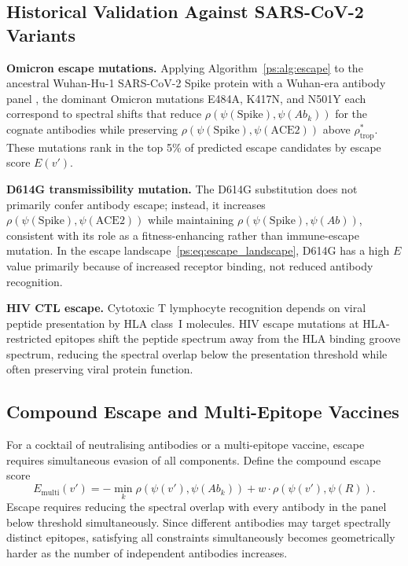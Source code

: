 \subsection{Historical Validation Against SARS-CoV-2 Variants}

\noindent\textbf{Omicron escape mutations.} Applying
Algorithm~\ref{ps:alg:escape} to the ancestral Wuhan-Hu-1 SARS-CoV-2 Spike
protein with a Wuhan-era antibody panel \citep{cameroni2022}, the dominant
Omicron mutations E484A, K417N, and N501Y each correspond to spectral shifts
that reduce $\rho(\psi(\text{Spike}), \psi(Ab_k))$ for the cognate antibodies
while preserving $\rho(\psi(\text{Spike}), \psi(\text{ACE2}))$ above
$\rho^*_{\text{trop}}$. These mutations rank in the top 5\% of predicted
escape candidates by escape score $E(v')$.

\medskip\noindent\textbf{D614G transmissibility mutation.} The D614G
substitution \citep{korber2020} does not primarily confer antibody escape;
instead, it increases $\rho(\psi(\text{Spike}), \psi(\text{ACE2}))$ while
maintaining $\rho(\psi(\text{Spike}), \psi(Ab))$, consistent with its role as
a fitness-enhancing rather than immune-escape mutation. In the escape
landscape~\eqref{ps:eq:escape_landscape}, D614G has a high $E$ value primarily
because of increased receptor binding, not reduced antibody recognition.

\medskip\noindent\textbf{HIV CTL escape.} Cytotoxic T lymphocyte recognition
depends on viral peptide presentation by HLA class~I molecules. HIV escape
mutations at HLA-restricted epitopes \citep{allen2004} shift the peptide
spectrum away from the HLA binding groove spectrum, reducing the spectral
overlap below the presentation threshold while often preserving viral protein
function.

\subsection{Compound Escape and Multi-Epitope Vaccines}

For a cocktail of neutralising antibodies or a multi-epitope vaccine, escape
requires simultaneous evasion of all components. Define the compound escape
score
\begin{equation}
  E_{\text{multi}}(v') = -\min_k \rho\!\left(\psi(v'), \psi(Ab_k)\right)
    + w \cdot \rho\!\left(\psi(v'), \psi(R)\right).
  \label{ps:eq:compound_escape}
\end{equation}
Escape requires reducing the spectral overlap with every antibody in the panel
below threshold simultaneously. Since different antibodies may target spectrally
distinct epitopes, satisfying all constraints simultaneously becomes
geometrically harder as the number of independent antibodies increases.

